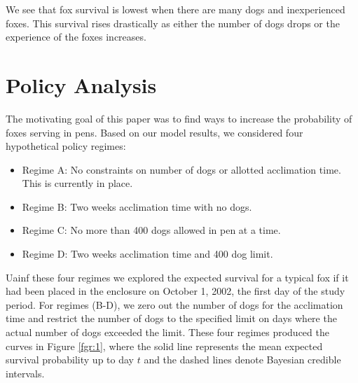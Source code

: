 \documentclass[aoas,preprint]{imsart}
\numberwithin{equation}{section}
\theoremstyle{plain}
\begin{document}
We see that fox survival is lowest when there are many dogs and inexperienced foxes. This survival rises drastically as either the number of dogs drops or the experience of the foxes increases.

\section{Policy Analysis}
 The motivating goal of this paper was to find ways to increase the probability of foxes serving in pens. Based on our model results, we considered four hypothetical policy regimes:
	\begin{itemize}
		\item Regime A: No constraints on number of dogs or allotted acclimation time. This is currently in place.
		\item Regime B: Two weeks acclimation time with no dogs.
		\item Regime C: No more than 400 dogs allowed in pen at a time.
		\item Regime D: Two weeks acclimation time and 400 dog limit.
	\end{itemize}
Uainf these four regimes we explored the expected survival for a typical fox if it had been placed in the enclosure on October 1, 2002, the first day of the study period. For regimes (B-D), we zero out the number of dogs for the acclimation time and restrict the number of dogs to the specified limit on days where the actual number of dogs exceeded the limit.
These four regimes produced the curves in Figure \ref{fgr:1}, where the solid line represents the mean expected survival probability up to day $t$ and the dashed lines denote Bayesian credible intervals.
\end{document}
